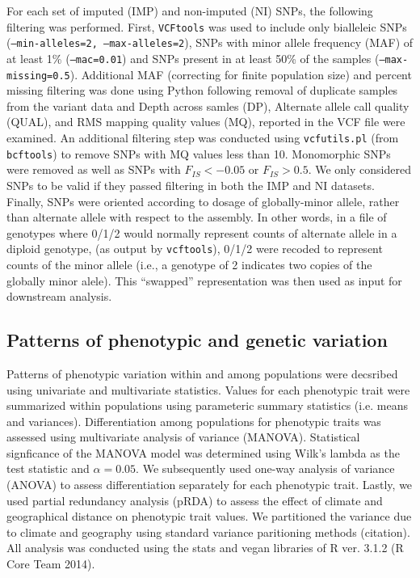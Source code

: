 \documentclass[fleqn,11pt]{wlpeerj}
\begin{document}
For each set of imputed (IMP) and non-imputed (NI) SNPs, the following filtering
was performed.  First, \texttt{VCFtools} was used to include only bialleleic
SNPs (\texttt{--min-alleles=2, --max-alleles=2}), SNPs with minor allele
frequency (MAF) of at least 1\% (\texttt{--mac=0.01}) and SNPs present in at
least 50\% of the samples (\texttt{--max-missing=0.5}).  Additional MAF
(correcting for  finite population size) and percent missing filtering was done
using Python following removal of duplicate samples from the variant data and
Depth across samles (DP), Alternate allele call quality (QUAL), and RMS mapping
quality values (MQ), reported in the VCF file were examined.  An additional
filtering step was conducted using \texttt{vcfutils.pl} (from \texttt{bcftools})
to remove SNPs with MQ values less than 10.  Monomorphic SNPs were removed as
well as SNPs with $F_{IS} < -0.05$ or $F_{IS} > 0.5$.  We only considered SNPs
to be valid if they passed filtering in both the IMP and NI datasets. Finally,
SNPs were oriented according to dosage of globally-minor allele, rather than
alternate allele with respect to the assembly. In other words, in a file of
genotypes where 0/1/2 would normally represent counts of alternate allele in a
diploid genotype,  (as output by \texttt{vcftools}), 0/1/2 were recoded to
represent counts of the minor allele (i.e., a genotype of 2 indicates two copies
of the globally minor alele). This ``swapped'' representation was then used as
input for downstream analysis.

\subsection*{Patterns of phenotypic and genetic variation}

Patterns of phenotypic variation within and among populations were decsribed using
univariate and multivariate statistics. Values for each phenotypic trait were summarized 
within populations using parameteric summary statistics (i.e. means and variances). Differentiation
among populations for phenotypic traits was assessed using multivariate analysis of variance (MANOVA). Statistical
signficance of the MANOVA model was determined using Wilk's lambda as the test statistic and $\alpha = 0.05$. 
We subsequently used one-way analysis of variance (ANOVA) to assess differentiation separately for each phenotypic 
trait. Lastly, we used partial redundancy analysis (pRDA) to assess the effect of climate and geographical distance on
phenotypic trait values. We partitioned the variance due to climate and geography using standard
variance paritioning methods (citation). All analysis was conducted using the stats and 
vegan libraries of R ver. 3.1.2 (R Core Team 2014). 
\end{document}

